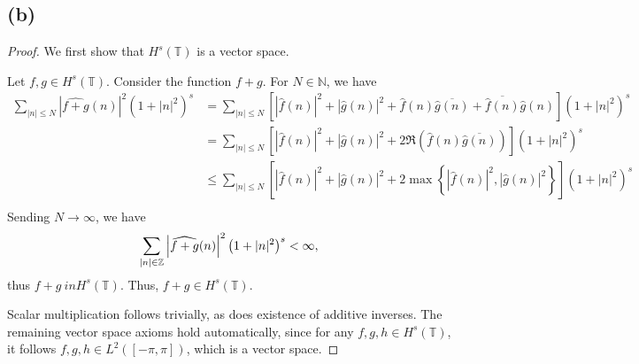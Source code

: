 \documentclass{article}
\newcommand{\N}{\mathbb{N}} %
\begin{document}
\subsection*{(b)}
\begin{proof}
	We first show that $H^s(\mathbb{T})$ is a vector space.
	
	Let $f, g \in H^s(\mathbb{T})$. Consider the function $f + g$. For $N \in \N$, we have
	\begin{align}
		\sum_{|n| \leq N} \left|\widehat{f + g}(n)\right|^2 \left(1 + |n|^2\right)^s &= \sum_{|n| \leq N} \left[\left|\hat{f}(n)\right|^2 + |\hat{g}(n)|^2 + \hat{f}(n)\overline{\hat{g}(n)} + \overline{\hat{f}(n)}\hat{g}(n)\right]\left(1 + |n|^2\right)^s \\
		&= \sum_{|n| \leq N} \left[\left|\widehat{f}(n)\right|^2 + \left|\hat{g}(n)\right|^2 + 2 \Re\left(\hat{f}(n)\overline{\hat{g}(n)}\right)\right]\left(1 + |n|^2\right)^s \\
		&\leq \sum_{|n| \leq N} \left[\left|\widehat{f}(n)\right|^2 + \left|\hat{g}(n)\right|^2 + 2 \max\left\{\left|\hat{f}(n)\right|^2, \left|\hat{g}(n)\right|^2\right\}\right]\left(1 + |n|^2\right)^s \\
	\end{align}
	Sending $N \to \infty$, we have
	\begin{equation}
		\sum_{|n| \in \mathbb{Z}} \left|\widehat{f + g}(n)\right|^2 \left(1 + |n|^2\right)^s < \infty, \\
	\end{equation}
	thus $f + g\ in H^s(\mathbb{T})$. Thus, $f + g \in H^s(\mathbb{T})$.
	
	Scalar multiplication follows trivially, as does existence of additive inverses. The remaining vector space axioms hold automatically, since for any $f, g, h \in H^s(\mathbb{T})$, it follows $f, g, h \in L^2([-\pi, \pi])$, which is a vector space.
	

\end{proof}
\end{document}
